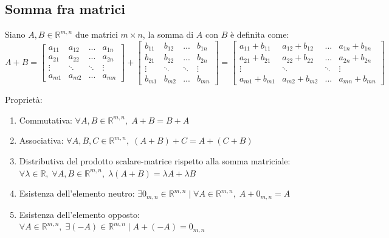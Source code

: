 \documentclass{article}
\begin{document}
\subsection{Somma fra matrici} \label{subsec:matsum}
    Siano $A, B \in \mathbb{R}^{m, n}$ due matrici $m \times n$, la somma di $A$ con $B$ è definita come:
    \[
        A + B = 
        \begin{bmatrix}
            a_{11} & a_{12} & ... & a_{1n} \\
            a_{21} & a_{22} & ... & a_{2n} \\
            \vdots & \ddots & \ddots & \vdots \\
            a_{m1} & a_{m2} & ... & a_{mn} 
        \end{bmatrix}
        +
        \begin{bmatrix}
            b_{11} & b_{12} & ... & b_{1n} \\
            b_{21} & b_{22} & ... & b_{2n} \\
            \vdots & \ddots & \ddots & \vdots \\
            b_{m1} & b_{m2} & ... & b_{mn} 
        \end{bmatrix}
        =
        \begin{bmatrix}
            a_{11} + b_{11} & a_{12} + b_{12} & ... & a_{1n} + b_{1n} \\
            a_{21} + b_{21} & a_{22} + b_{22} & ... & a_{2n} + b_{2n} \\
            \vdots & \ddots & \ddots & \vdots \\
            a_{m1} + b_{m1} & a_{m2} + b_{m2} & ... & a_{mn} + b_{mn} 
        \end{bmatrix}
    \]

    \vspace{10pt}
    Proprietà:
    \begin{enumerate}[label=(\arabic*)]
        \item Commutativa: $\forall A, B \in \mathbb{R}^{m, n}, \; A + B = B + A$
        \item Associativa: $\forall A, B, C \in \mathbb{R}^{m, n}, \; (A + B) + C = A + (C + B)$
        \item Distributiva del prodotto scalare-matrice rispetto alla somma matriciale: $\forall \lambda \in \mathbb{R}, \; \forall A, B \in \mathbb{R}^{m, n}, \; \lambda(A + B) = \lambda A + \lambda B$  
        \item Esistenza dell'elemento neutro: $\exists 0_{m, n} \in \mathbb{R}^{m, n} \; | \; \forall A \in \mathbb{R}^{m, n}, \; A + 0_{m, n} = A $ 
        \item Esistenza dell'elemento opposto: $\forall A \in \mathbb{R}^{m, n}, \; \exists (-A) \in \mathbb{R}^{m, n} \; | \; A + (-A) = 0_{m, n}$
    \end{enumerate}
\end{document}
